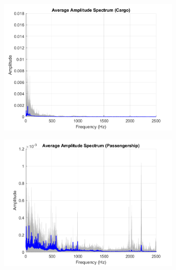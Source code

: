 \begin{figure}[p]
    \centering
    \begin{subfigure}{0.49\textwidth}
        \centering
        \includegraphics[width=\linewidth]{img/ch3/freq_ampl/cargo_freq_amplitude.png} 
    \end{subfigure}
    \hfill
    \begin{subfigure}{0.49\textwidth}
        \centering
        \includegraphics[width=\linewidth]{img/ch3/freq_ampl/passengership_freq_amplitude.png} 
    \end{subfigure}

    \vspace{0.5cm} %


\end{figure}
